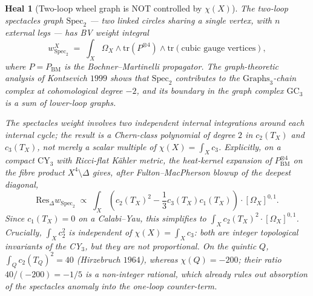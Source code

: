 \documentclass[11pt]{article}
\newtheorem{heal}[theorem]{Heal}
\providecommand{\CY}{\mathrm{CY}}
\providecommand{\Om}{\Omega}
\providecommand{\Graphs}{\mathrm{Graphs}}
\providecommand{\GC}{\mathrm{GC}}
\begin{document}
\begin{heal}[Two-loop wheel graph is NOT controlled by $\chi(X)$]
\label{heal:two-loop-not-chi}
The two-loop spectacles graph $\mathrm{Spec}_2$ --- two linked circles
sharing a single vertex, with $n$ external legs --- has BV weight
integral
\[
  w_{\mathrm{Spec}_2}^X \;=\; \int_X \Om_X \wedge \mathrm{tr}(P^{\otimes 4}) \wedge
    \mathrm{tr}(\text{cubic gauge vertices}),
\]
where $P = P_{\mathrm{BM}}$ is the Bochner--Martinelli propagator.
The graph-theoretic analysis of Kontsevich $1999$ shows that
$\mathrm{Spec}_2$ contributes to the $\Graphs_3$-chain complex
at cohomological degree $-2$, and its boundary in the graph complex
$\GC_3$ is a sum of lower-loop graphs.

The spectacles weight involves \emph{two} independent internal
integrations around each internal cycle; the result is a Chern-class
polynomial of degree $2$ in $c_2(T_X)$ and $c_3(T_X)$, not merely a
scalar multiple of $\chi(X) = \int_X c_3$.  Explicitly, on a
compact $\CY_3$ with Ricci-flat K\"ahler metric, the heat-kernel
expansion of $P_{\mathrm{BM}}^{\otimes 4}$ on the fibre product
$X^{4} \setminus \Delta$ gives, after Fulton--MacPherson blowup of
the deepest diagonal,
\[
  \mathrm{Res}_{\Delta} w_{\mathrm{Spec}_2} \;\propto\;
  \int_X \left(c_2(T_X)^2 - \frac{1}{3} c_3(T_X) c_1(T_X)\right) \cdot [\Om_X]^{0,1}.
\]
Since $c_1(T_X) = 0$ on a Calabi--Yau, this simplifies to
$\int_X c_2(T_X)^2 \cdot [\Om_X]^{0,1}$.  Crucially,
$\int_X c_2^2$ is \emph{independent} of $\chi(X) = \int_X c_3$:
both are integer topological invariants of the CY$_3$, but they are
not proportional.  On the quintic $Q$, $\int_Q c_2(T_Q)^2 = 40$
(Hirzebruch $1964$), whereas $\chi(Q) = -200$; their ratio
$40/(-200) = -1/5$ is a non-integer rational, which already rules
out absorption of the spectacles anomaly into the one-loop
counter-term.
\end{heal}
\end{document}
